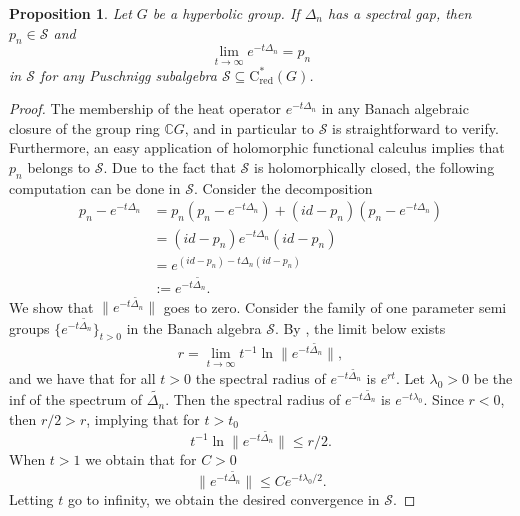 \documentclass[a4paper,leqno,12pt]{article}
\numberwithin{equation}{section}
\theoremstyle{plain}
\newtheorem{proposition}[theoremcounter]{Proposition}
\theoremstyle{definition}
\theoremstyle{remark}
\newcommand{\Csr}{\mathrm{C}^*_{\text{red}}}
\begin{document}
        \begin{proposition}
        	Let $G$ be a hyperbolic group. If $\Delta_n$ has a spectral gap, then  
         $p_n\in \mathcal S$ and $$\lim_{t\to \infty} e^{-t \Delta_n}=p_n$$ 
        	in $\mathcal S$ for any Puschnigg subalgebra $\mathcal S \subseteq \Csr(G)$.
		\end{proposition}
	\begin{proof}
		The membership of the heat operator $e^{-t \Delta_n}$ in any Banach algebraic closure of the group ring $\mathbb CG$, and in particular to $\mathcal S$ is straightforward to verify. Furthermore, an easy application of holomorphic functional calculus implies that $p_n$ belongs to $\mathcal S$. 
		Due to the fact that $\mathcal S$ is holomorphically closed, the following computation can be done in $\mathcal S$.		
		Consider the decomposition
		\begin{align*}
			p_n - e^{-t \Delta_n} &= p_n (p_n - e^{-t \Delta_n}) + (id - p_n)(p_n - e^{-t \Delta_n})\\
			&= (id - p_n) e^{-t \Delta_n} (id - p_n)\\
			&= e^{(id - p_n)-t \Delta_n (id - p_n)}\\
			&:=  e^{-t \tilde{\Delta_n}}.
		\end{align*}
		We show that $\|e^{-t \tilde{\Delta_n}} \|$ goes to zero.
		Consider the family of one parameter semi groups $\{e^{-t \tilde{\Delta_n}}\}_{t>0}$ in the Banach algebra $\mathcal S$. By \cite [Theorem 1.22]{davies1980}, the limit below exists
		\[
			r = \lim_{t \to \infty} t^{-1} \ln \|e^{-t \tilde{\Delta_n}} \|,
		\]
		and we have that for all $t> 0$ the spectral radius of $e^{-t \tilde{\Delta_n}}$ is $e^{rt}$. Let $\lambda_0 > 0$ be the inf of the spectrum of $\tilde{\Delta_n}$. Then the spectral radius of $e^{-t \tilde{\Delta_n}}$ is $e ^{-t \lambda_0}$.
		Since $r < 0$, then $r/2 > r$, implying that for $t>t_0$
		\[
		t^{-1} \ln \|e^{-t \tilde{\Delta_n}} \| \leq r/2.
		\]
		When $t>1$ we obtain that for $C>0$
		\[
		\|e^{-t \tilde{\Delta_n}} \| \leq C e ^{-t \lambda_0/ 2}.
		\]
		Letting $t$ go to infinity, we obtain the desired convergence in $\mathcal S$.
	\end{proof}	
		
	
	
	
	
	
	
	
	
\end{document}
